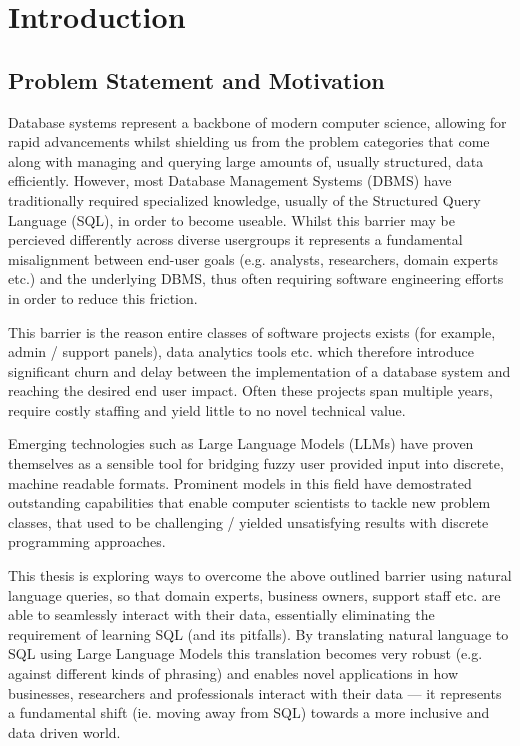 \documentclass{article}
\begin{document}
\newpage

\section{Introduction}
\subsection{Problem Statement and Motivation}

Database systems represent a backbone of modern computer science, allowing for rapid advancements
whilst shielding us from the problem categories that come along with managing and querying large amounts
of, usually structured, data efficiently. However, most Database Management Systems (DBMS) have
traditionally required specialized knowledge, usually of the Structured Query Language (SQL), in order
to become useable. Whilst this barrier may be percieved differently across diverse usergroups it
represents a fundamental misalignment between end-user goals (e.g. analysts, researchers, domain experts
etc.) and the underlying DBMS, thus often requiring software engineering efforts in order to reduce this friction.

This barrier is the reason entire classes of software projects exists (for example, admin / support panels),
data analytics tools etc. which therefore introduce significant churn and delay between the implementation
of a database system and reaching the desired end user impact. Often these projects span multiple years, require
costly staffing and yield little to no novel technical value.

Emerging technologies such as Large Language Models (LLMs) have proven themselves as a sensible tool for bridging
fuzzy user provided input into discrete, machine readable formats. Prominent models in this field have demostrated
outstanding capabilities that enable computer scientists to tackle new problem classes, that used to be
challenging / yielded unsatisfying results with discrete programming approaches.

This thesis is exploring ways to overcome the above outlined barrier using natural language queries, so that domain experts,
business owners, support staff etc. are able to seamlessly interact with their data, essentially eliminating the
requirement of learning SQL (and its pitfalls). By translating natural language to SQL using Large Language Models
this translation becomes very robust (e.g. against different kinds of phrasing) and enables novel applications
in how businesses, researchers and professionals interact with their data — it represents a fundamental shift 
(ie. moving away from SQL) towards a more inclusive and data driven world. 
\end{document}
